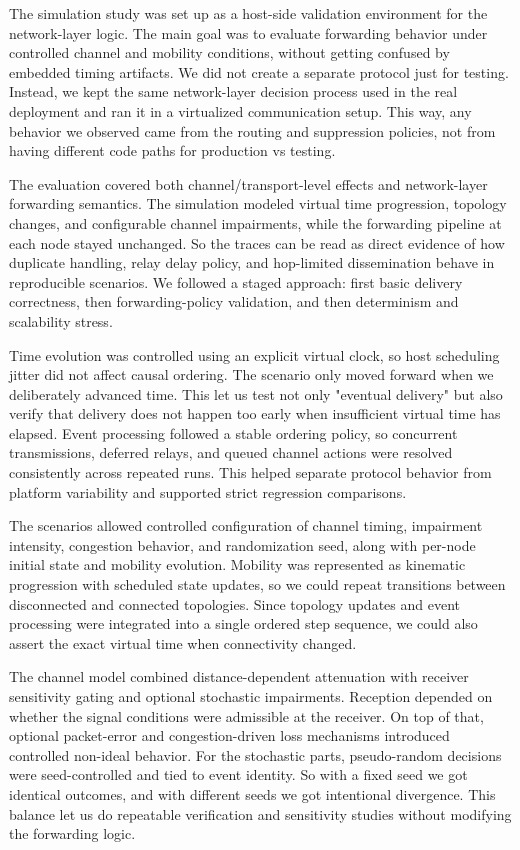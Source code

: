 The simulation study was set up as a host-side validation environment for the network-layer logic. The main
goal was to evaluate forwarding behavior under controlled channel and mobility conditions, without getting
confused by embedded timing artifacts. We did not create a separate protocol just for testing. Instead, we
kept the same network-layer decision process used in the real deployment and ran it in a virtualized
communication setup. This way, any behavior we observed came from the routing and suppression policies, not
from having different code paths for production vs testing.

The evaluation covered both channel/transport-level effects and network-layer forwarding semantics. The
simulation modeled virtual time progression, topology changes, and configurable channel impairments, while the
forwarding pipeline at each node stayed unchanged. So the traces can be read as direct evidence
of how duplicate handling, relay delay policy, and hop-limited dissemination behave in reproducible scenarios.
We followed a staged approach: first basic delivery correctness, then forwarding-policy validation, and then
determinism and scalability stress.

Time evolution was controlled using an explicit virtual clock, so host scheduling jitter did not affect causal
ordering. The scenario only moved forward when we deliberately advanced time. This let us test not only
"eventual delivery" but also verify that delivery does not happen too early when insufficient virtual time has
elapsed. Event processing followed a stable ordering policy, so concurrent transmissions, deferred relays, and
queued channel actions were resolved consistently across repeated runs. This helped separate protocol behavior
from platform variability and supported strict regression comparisons.

The scenarios allowed controlled configuration of channel timing, impairment intensity, congestion behavior,
and randomization seed, along with per-node initial state and mobility evolution. Mobility was represented as
kinematic progression with scheduled state updates, so we could repeat transitions between disconnected and
connected topologies. Since topology updates and event processing were integrated into a single ordered step
sequence, we could also assert the exact virtual time when connectivity changed.

The channel model combined distance-dependent attenuation with receiver sensitivity gating and optional
stochastic impairments. Reception depended on whether the signal conditions were admissible at the receiver.
On top of that, optional packet-error and congestion-driven loss mechanisms introduced controlled non-ideal
behavior. For the stochastic parts, pseudo-random decisions were seed-controlled and tied to event identity.
So with a fixed seed we got identical outcomes, and with different seeds we got intentional divergence. This
balance let us do repeatable verification and sensitivity studies without modifying the forwarding logic.

